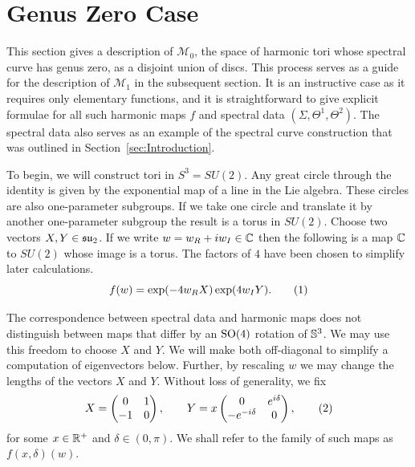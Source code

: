 \documentclass{article}
\begin{document}
\section{Genus Zero Case}
\label{sec:Genus Zero}

This section gives a description of $\mathcal{M}_0$, the space of harmonic tori whose spectral curve has genus zero, as a disjoint union of discs. This process serves as a guide for the description of $\mathcal{M}_1$ in the subsequent section. It is an instructive case as it requires only elementary functions, and it is straightforward to give explicit formulae for all such harmonic maps $f$ and spectral data $(\Sigma,\Theta^1,\Theta^2)$. The spectral data also serves as an example of the spectral curve construction that was outlined in Section~\ref{sec:Introduction}. 


To begin, we will construct tori in $S^3 = SU(2)$. Any great circle through the identity is given by the exponential map of a line in the Lie algebra. These circles are also one-parameter subgroups. If we take one circle and translate it by another one-parameter subgroup the result is a torus in $SU(2)$. Choose two vectors $X,Y\in \su_2$. If we write $w = w_R + \iu w_I \in \C$ then the following is a map $\C$ to $SU(2)$ whose image is a torus. The factors of $4$ have been chosen to simplify later calculations. 
\[
f(w) = \exp( -4 w_R X ) \exp( 4 w_I Y ).
\labelthis{eqn:genus zero simple map}
\]

The correspondence between spectral data and harmonic maps does not distinguish between maps that differ by an $\SO(4)$ rotation of $\S^3$. We may use this freedom to choose $X$ and $Y$. We will make both off-diagonal to simplify a computation of eigenvectors below. Further, by rescaling $w$ we may change the lengths of the vectors $X$ and $Y$. Without loss of generality, we fix 
\[
X = \begin{pmatrix}
0 & 1 \\ -1 & 0
\end{pmatrix}, \qquad
Y = x\begin{pmatrix}
0 & e^{\iu \delta} \\ -e^{-\iu \delta} & 0
\end{pmatrix},
\labelthis{eqn:def delta}
\]
for some $x \in \R^+$ and $\delta\in (0,\pi)$. We shall refer to the family of such maps as $f(x,\delta)(w)$.
\end{document}
